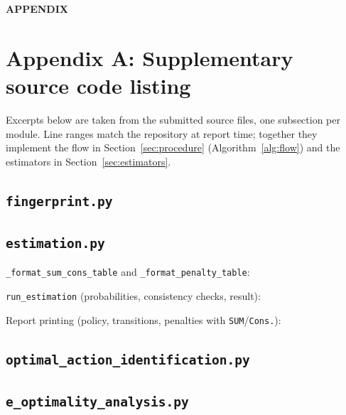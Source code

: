 \documentclass[11pt,a4paper]{article}
\begin{document}
\clearpage
\appendix
\begin{center}
  {\Large\bfseries APPENDIX}
\end{center}
\vspace{0.75em}

%
\section*{Appendix A: Supplementary source code listing}%
\label{app:code}%
%

Excerpts below are taken from the submitted source files, one subsection per module.
Line ranges match the repository at report time; together they implement the
flow in Section~\ref{sec:procedure} (Algorithm~\ref{alg:flow}) and the estimators in
Section~\ref{sec:estimators}.

\subsection{\texttt{fingerprint.py}}\label{app:fingerprint}



\subsection{\texttt{estimation.py}}\label{app:estimation}

\texttt{\_format\_sum\_cons\_table} and \texttt{\_format\_penalty\_table}:


\texttt{run\_estimation} (probabilities, consistency checks, result):


Report printing (policy, transitions, penalties with \texttt{SUM}/\texttt{Cons.}):


\subsection{\texttt{optimal\_action\_identification.py}}\label{app:optimal}



\subsection{\texttt{e\_optimality\_analysis.py}}\label{app:epsilon}
\end{document}
